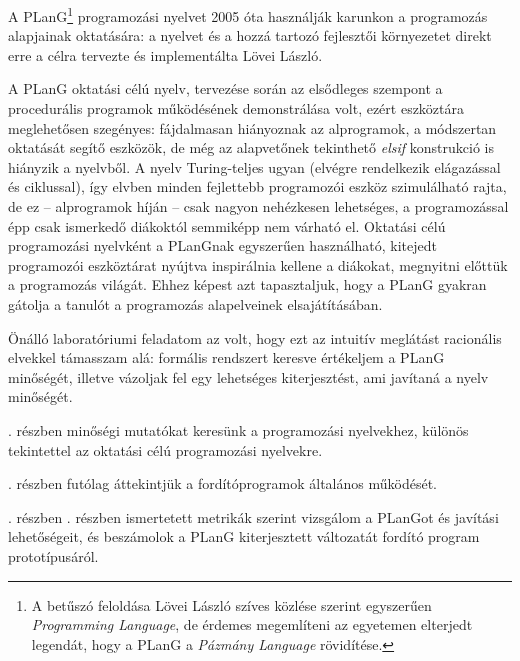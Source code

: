 

A PLanG\footnote{%
	A betűszó feloldása Lövei László szíves közlése szerint egyszerűen \textit{Programming Lan\-guage}, de érdemes megemlíteni az egyetemen elterjedt legendát, hogy a PLanG a \textit{Pázmány Language} rövidítése.}%
programozási nyelvet 2005 óta használják karunkon a programozás alapjainak oktatására: a nyelvet és a hozzá tartozó fejlesztői környezetet direkt erre a célra tervezte és implementálta Lövei László.

A PLanG oktatási célú nyelv, tervezése során az elsődleges szempont a procedurális programok működésének demonstrálása volt\cite{lovei}, ezért eszköztára meglehetősen szegényes: fájdalmasan hiányoznak az alprogramok, a módszertan oktatását segítő eszközök, de még az alapvetőnek tekinthető \textit{elsif} kon\-strukció is hiányzik a nyelvből.
A nyelv Turing-teljes ugyan (elvégre rendelkezik elágazással és ciklussal), így elvben minden fejlettebb programozói eszköz szimulálható rajta, de ez -- alprogramok híján -- csak nagyon nehézkesen lehetséges, a programozással épp csak ismerkedő diákoktól semmiképp nem várható el.
Oktatási célú programozási nyelvként a PLanGnak egyszerűen használható, kitejedt programozói eszköztárat nyújtva inspirálnia kellene a diákokat, megnyitni előttük a programozás világát.
Ehhez képest azt tapasztaljuk, hogy a PLanG gyakran gátolja a tanulót a programozás alapelveinek elsajátításában.

Önálló laboratóriumi feladatom az volt, hogy ezt az intuitív meglátást racionális elvekkel támasszam alá: formális rendszert keresve értékeljem a PLanG minőségét, illetve vázoljak fel egy lehetséges kiterjesztést, ami javítaná a nyelv minőségét.

. részben minőségi mutatókat keresünk a programozási nyelvekhez, különös tekintettel az oktatási célú programozási nyelvekre.

. részben futólag áttekintjük a fordítóprogramok általános működését.

. részben . részben ismertetett metrikák szerint vizsgálom a PLanGot és javítási lehetőségeit, és beszámolok a PLanG kiterjesztett változatát fordító program prototípusáról.
